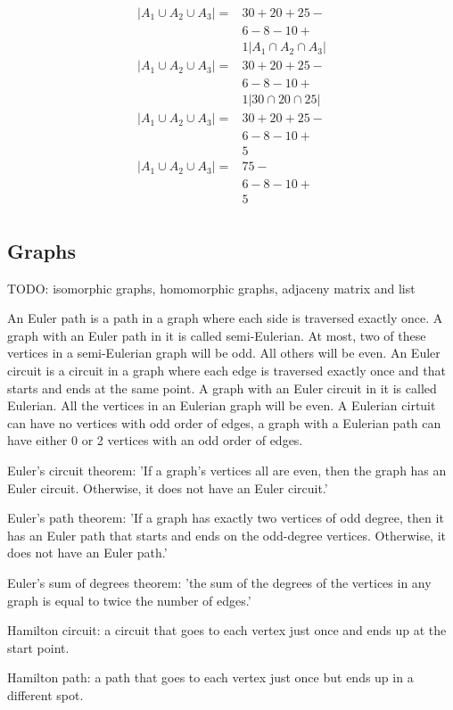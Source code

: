 \documentclass{article}
\begin{document}
\begin{align*}
|A_1 \cup A_2 \cup A_3| = & 30 + 20 + 25  - \\& 6 - 8 - 10 + \\ & 1|A_1\cap A_2 \cap A_3| \\
|A_1 \cup A_2 \cup A_3| = & 30 + 20 + 25  - \\& 6 - 8 - 10 + \\ & 1|30 \cap 20 \cap 25| \\
|A_1 \cup A_2 \cup A_3| = & 30 + 20 + 25  - \\& 6 - 8 - 10 + \\ & 5 \\
|A_1 \cup A_2 \cup A_3| = & 75  - \\& 6 - 8 - 10 + \\ & 5 \\
\end{align*}
\subsection{Graphs}
TODO: isomorphic graphs, homomorphic graphs, adjaceny matrix and list

An Euler path is a path in a graph where each side is traversed exactly once. A graph with an Euler path in it is called semi-Eulerian. At most, two of these vertices in a semi-Eulerian graph will be odd. All others will be even. An Euler circuit is a circuit in a graph where each edge is traversed exactly once and that starts and ends at the same point. A graph with an Euler circuit in it is called Eulerian. All the vertices in an Eulerian graph will be even. A Eulerian cirtuit can have no vertices with odd order of edges, a graph with a Eulerian path can have either 0 or 2 vertices with an odd order of edges.

Euler's circuit theorem: 'If a graph's vertices all are even, then the graph has an Euler circuit. Otherwise, it does not have an Euler circuit.'

Euler's path theorem: 'If a graph has exactly two vertices of odd degree, then it has an Euler path that starts and ends on the odd-degree vertices. Otherwise, it does not have an Euler path.'

Euler's sum of degrees theorem: 'the sum of the degrees of the vertices in any graph is equal to twice the number of edges.'

Hamilton circuit: a circuit that goes to each vertex just once and ends up at the start point. 

Hamilton path: a path that goes to each vertex just once but ends up in a different spot.
\end{document}
